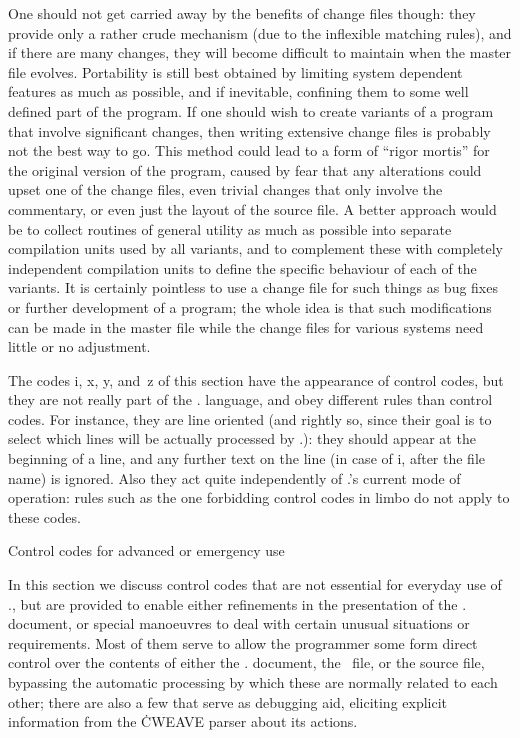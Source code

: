 One should not get carried away by the benefits of change files though: they
provide only a rather crude mechanism (due to the inflexible matching
rules), and if there are many changes, they will become difficult to
maintain when the master file evolves. Portability is still best obtained by
limiting system dependent features as much as possible, and if inevitable,
confining them to some well defined part of the program. If one should wish
to create variants of a program that involve significant changes, then
writing extensive change files is probably not the best way to go. This
method could lead to a form of ``rigor mortis'' for the original version of
the program, caused by fear that any alterations could upset one of the
change files, even trivial changes that only involve the commentary, or even
just the layout of the source file. A better approach would be to collect
routines of general utility as much as possible into separate compilation
units used by all variants, and to complement these with completely
independent compilation units to define the specific behaviour of each of
the variants. It is certainly pointless to use a change file for such things
as bug fixes or further development of a program; the whole idea is that
such modifications can be made in the master file while the change files for
various systems need little or no adjustment.

The codes \:i, \:x, \:y, and~\:z of this section have the appearance of
control codes, but they are not really part of the \CWEB.  language, and
obey different rules than control codes. For instance, they are line
oriented (and rightly so, since their goal is to select which lines will be
actually processed by \CWEB.): they should appear at the beginning of a
line, and any further text on the line (in case of \:i, after the file name)
is ignored. Also they act quite independently of \CWEB.'s current mode of
operation: rules such as the one forbidding control codes in limbo do not
apply to these codes.


\beginsection Control codes for advanced or emergency use

In this section we discuss control codes that are not essential for everyday
use of \CWEB., but are provided to enable either refinements in the
presentation of the \CWEB. document, or special manoeuvres to deal with
certain unusual situations or requirements. Most of them serve to allow the
programmer some form direct control over the contents of either the \CWEB.
document, the \Cee~file, or the source file, bypassing the automatic
processing by which these are normally related to each other; there are also
a few that serve as debugging aid, eliciting explicit information from the
\.{CWEAVE} parser about its actions.

